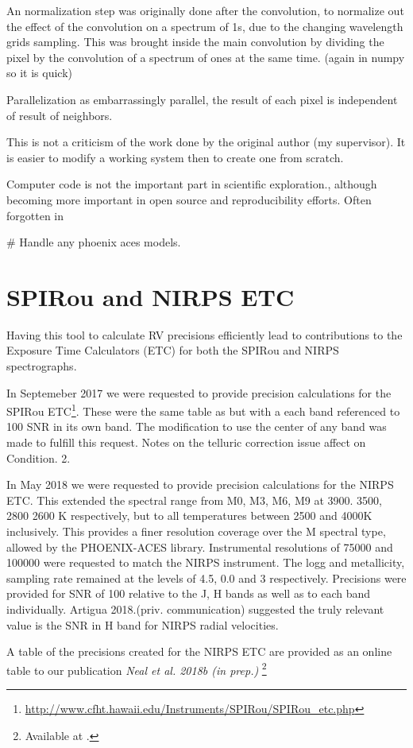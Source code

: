 An normalization step was originally done after the convolution, to normalize out the effect of the convolution on a spectrum of 1s, due to the changing wavelength grids sampling. This was brought inside the main convolution by dividing the pixel by the convolution of a spectrum of ones at the same time. (again in numpy so it is quick)

Parallelization as embarrassingly parallel, the result of each pixel is independent of result of neighbors.

This is not a criticism of the work done by the original author (my supervisor). It is easier to modify a working system then to create one from scratch.

Computer code is not the important part in scientific exploration., although becoming more important in open source and reproducibility efforts. Often forgotten in 

\# Handle any phoenix aces models.


\section{SPIRou and NIRPS ETC}
Having this tool to calculate RV precisions efficiently lead to contributions to the Exposure Time Calculators (ETC) for both the SPIRou and NIRPS spectrographs.

In Septemeber 2017 we were requested to provide precision calculations for the SPIRou ETC\footnote{\url{http://www.cfht.hawaii.edu/Instruments/SPIRou/SPIRou_etc.php}}. These were the same table as \citet{figueira_radial_2016} but with a each band referenced to 100 SNR in its own band. The modification to use the center of any band was made to fulfill this request. Notes on the telluric correction issue affect on Condition. 2.  

In May 2018 we were requested to provide precision calculations for the NIRPS ETC. This extended the spectral range from M0, M3, M6, M9 at 3900. 3500, 2800 2600 K respectively, but to all temperatures between 2500 and 4000K inclusively. This provides a finer resolution coverage over the M spectral type, allowed by the PHOENIX-ACES library.
Instrumental resolutions of 75000 and 100000 were requested to match the NIRPS instrument.
The logg and metallicity, sampling rate remained at the \citet{figueira_radial_2016} levels of 4.5, 0.0 and 3 respectively.
Precisions were provided for SNR of 100 relative to the J, H bands as well as to each band individually. Artigua 2018.(priv. communication) suggested the truly relevant value is the SNR in H band for NIRPS radial velocities.

A table of the precisions created for the NIRPS ETC are provided as an online table to our publication \textit{Neal et al. 2018b (in prep.)} \footnote{Available at \url{}.}  


